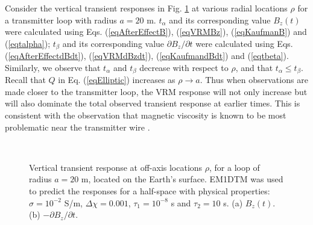 \documentclass[journal]{IEEEtran}  %
\begin{document}
Consider the vertical transient responses in Fig.
\ref{figEMandVRMrespOffAxis} at various radial locations $\rho$ for
a transmitter loop with radius $a=20$ m. $t_{\alpha}$ and its
corresponding value $B_z(t)$ were calculated using Eqs.
(\ref{eqAfterEffectB}), (\ref{eqVRMBz}), (\ref{eqKaufmanB}) and
(\ref{eqtalpha}); $t_{\beta}$ and its corresponding value $\partial
B_z/\partial t$ were calculated using Eqs.
(\ref{eqAfterEffectdBdt}), (\ref{eqVRMdBzdt}), (\ref{eqKaufmandBdt})
and (\ref{eqtbeta}). Similarly, we observe that $t_\alpha$ and
$t_\beta$ decrease with respect to $\rho$, and that $t_\alpha \leq
t_\beta$. Recall that $Q$ in Eq. (\ref{eqElliptic})
increases as $\rho \rightarrow a$. Thus when observations are made closer
to the transmitter loop, the VRM response will not only increase but will
also dominate the total observed transient response at earlier
times. This is consistent with the observation that magnetic
viscosity is known to be most problematic near the transmitter wire
\cite{Buselli1982,Lee1984,Barsukov2001}.

%
\begin{figure}[!t]
    \centering
    \\
    \vspace{-10pt}
    \caption{Vertical transient response at off-axis locations $\rho$,
    for a loop of radius $a=20$ m, located on the Earth's surface.
    EM1DTM was used to predict the responses for a half-space with
    physical properties: $\sigma=10^{-2}$ S/m, $\Delta \chi=0.001$, $\tau_1=10^{-8}$ s and $\tau_2=10$ s. (a) $B_z (t)$. (b) $-\partial B_z/\partial t$.}
    \label{figEMandVRMrespOffAxis}
\end{figure}
%
\end{document}
